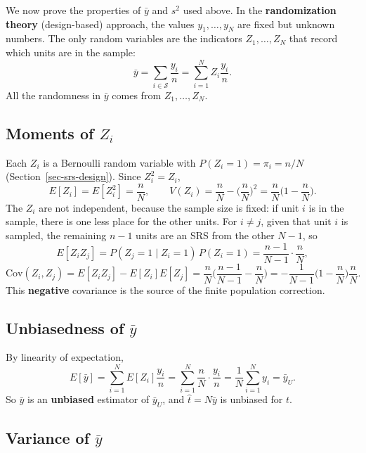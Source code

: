 \documentclass[
  letterpaper,
  DIV=11,
  numbers=noendperiod]{scrreprt}
\renewcommand{\[}{\begin{equation}}
\renewcommand{\]}{\end{equation}}
\begin{document}
We now prove the properties of \(\bar y\) and \(s^2\) used above. In the
\textbf{randomization theory} (design-based) approach, the values
\(y_1, \ldots, y_N\) are fixed but unknown numbers. The only random
variables are the indicators \(Z_1, \ldots, Z_N\) that record which
units are in the sample: \[
\bar y = \sum_{i\in\mathcal S} \frac{y_i}{n} = \sum_{i=1}^N Z_i \frac{y_i}{n} .
\] All the randomness in \(\bar y\) comes from \(Z_1,\ldots,Z_N\).

\subsection{\texorpdfstring{Moments of
\(Z_i\)}{Moments of Z\_i}}\label{moments-of-z_i}

Each \(Z_i\) is a Bernoulli random variable with
\(P(Z_i=1) = \pi_i = n/N\) (Section~\ref{sec-srs-design}). Since
\(Z_i^2 = Z_i\), \[
E[Z_i] = E[Z_i^2] = \frac nN, \qquad
V(Z_i) = \frac nN - \Big(\frac nN\Big)^2 = \frac nN\Big(1-\frac nN\Big).
\] The \(Z_i\) are not independent, because the sample size is fixed: if
unit \(i\) is in the sample, there is one less place for the other
units. For \(i\ne j\), given that unit \(i\) is sampled, the remaining
\(n-1\) units are an SRS from the other \(N-1\), so \[
E[Z_iZ_j] = P(Z_j=1\mid Z_i=1)\,P(Z_i=1) = \frac{n-1}{N-1}\cdot\frac nN ,
\] \[
\mathrm{Cov}(Z_i,Z_j) = E[Z_iZ_j]-E[Z_i]E[Z_j]
 = \frac nN\Big(\frac{n-1}{N-1} - \frac nN\Big)
 = -\frac{1}{N-1}\Big(1-\frac nN\Big)\frac nN .
\] This \textbf{negative} covariance is the source of the finite
population correction.

\subsection{\texorpdfstring{Unbiasedness of
\(\bar y\)}{Unbiasedness of \textbackslash bar y}}\label{unbiasedness-of-bar-y}

By linearity of expectation, \[
E[\bar y] = \sum_{i=1}^N E[Z_i]\frac{y_i}{n}
 = \sum_{i=1}^N \frac{n}{N}\cdot\frac{y_i}{n}
 = \frac1N \sum_{i=1}^N y_i = \bar y_{U}.
\] So \(\bar y\) is an \textbf{unbiased} estimator of \(\bar y_{U}\),
and \(\hat t = N\bar y\) is unbiased for \(t\).

\subsection{\texorpdfstring{Variance of
\(\bar y\)}{Variance of \textbackslash bar y}}\label{variance-of-bar-y}
\end{document}
